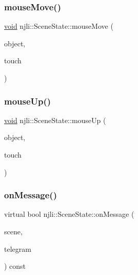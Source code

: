 \mbox{\label{classnjli_1_1_scene_state_a2dc269f881e2685742813f56f412d36a}} 
\subsubsection{\texorpdfstring{mouse\+Move()}{mouseMove()}}
{\footnotesize\ttfamily \mbox{\hyperlink{_thread_8h_af1e856da2e658414cb2456cb6f7ebc66}{void}} njli\+::\+Scene\+State\+::mouse\+Move (\begin{DoxyParamCaption}\item[{\mbox{\hyperlink{classnjli_1_1_scene}{Scene}} $\ast$}]{object,  }\item[{const \mbox{\hyperlink{classnjli_1_1_device_mouse}{Device\+Mouse}} \&}]{touch }\end{DoxyParamCaption})}

\mbox{\label{classnjli_1_1_scene_state_a2bc77b1d7e48504e1273c82fc8c82e7d}} 
\subsubsection{\texorpdfstring{mouse\+Up()}{mouseUp()}}
{\footnotesize\ttfamily \mbox{\hyperlink{_thread_8h_af1e856da2e658414cb2456cb6f7ebc66}{void}} njli\+::\+Scene\+State\+::mouse\+Up (\begin{DoxyParamCaption}\item[{\mbox{\hyperlink{classnjli_1_1_scene}{Scene}} $\ast$}]{object,  }\item[{const \mbox{\hyperlink{classnjli_1_1_device_mouse}{Device\+Mouse}} \&}]{touch }\end{DoxyParamCaption})}

\mbox{\label{classnjli_1_1_scene_state_add899a791145ac1a06ee1f54d0b60196}} 
\subsubsection{\texorpdfstring{on\+Message()}{onMessage()}}
{\footnotesize\ttfamily virtual bool njli\+::\+Scene\+State\+::on\+Message (\begin{DoxyParamCaption}\item[{\mbox{\hyperlink{classnjli_1_1_scene}{Scene}} $\ast$}]{scene,  }\item[{const \mbox{\hyperlink{classnjli_1_1_telegram}{Telegram}} \&}]{telegram }\end{DoxyParamCaption}) const\hspace{0.3cm}{\ttfamily [virtual]}}




